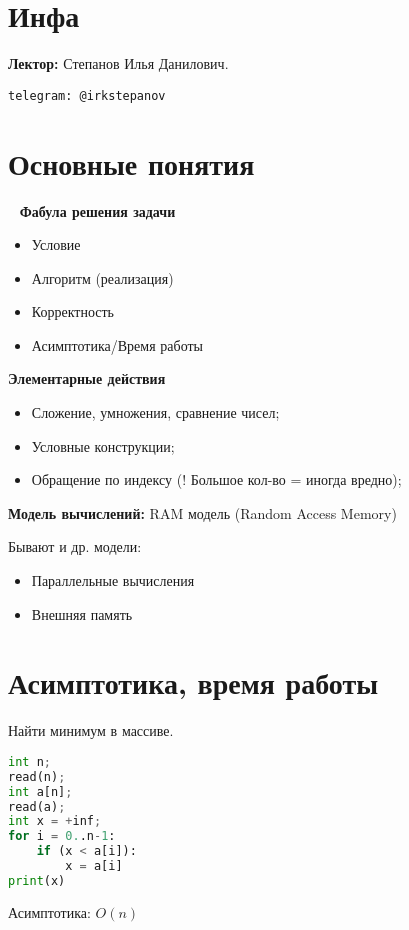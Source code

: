 \section{Инфа}
\textbf{Лектор:} Степанов Илья Данилович.

\begin{verbatim}
telegram: @irkstepanov
\end{verbatim}

\section{Основные понятия}
~\newline
\textbf{Фабула решения задачи}
\begin{itemize}
    \item Условие
    \item Алгоритм (реализация)
    \item Корректность
    \item Асимптотика/Время работы
\end{itemize}

\textbf{Элементарные действия}
\begin{itemize}
    \item Сложение, умножения, сравнение чисел;
    \item Условные конструкции;
    \item Обращение по индексу (! Большое кол-во = иногда вредно);
\end{itemize}

\textbf{Модель вычислений:} RAM модель (Random Access Memory)

\begin{note}
Бывают и др. модели:
\begin{itemize}
    \item Параллельные вычисления
    \item Внешняя память
\end{itemize}

\end{note}

\section{Асимптотика, время работы}

\begin{example}
Найти минимум в массиве.
\lstset{style=mystyle}
\begin{lstlisting}[language=Python, caption=Нахождение минимума]
int n;
read(n);
int a[n];
read(a);
int x = +inf;
for i = 0..n-1:
    if (x < a[i]):
        x = a[i]
print(x)
\end{lstlisting}
Асимптотика: $O(n)$
\end{example}

